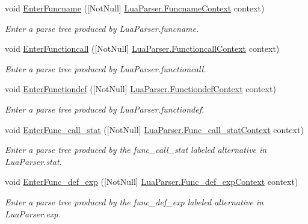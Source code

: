\begin{DoxyCompactItemize}
void \mbox{\hyperlink{classzlua_1_1_compiler_a0da2d547d2333616052b776e192eaae5}{Enter\+Funcname}} (\mbox{[}Not\+Null\mbox{]} \mbox{\hyperlink{classzlua_1_1_lua_parser_1_1_funcname_context}{Lua\+Parser.\+Funcname\+Context}} context)
\begin{DoxyCompactList}\small\item\em Enter a parse tree produced by Lua\+Parser.\+funcname. \end{DoxyCompactList}\item 
void \mbox{\hyperlink{classzlua_1_1_compiler_a17169577cf49b4387d6f65f07354e370}{Enter\+Functioncall}} (\mbox{[}Not\+Null\mbox{]} \mbox{\hyperlink{classzlua_1_1_lua_parser_1_1_functioncall_context}{Lua\+Parser.\+Functioncall\+Context}} context)
\begin{DoxyCompactList}\small\item\em Enter a parse tree produced by Lua\+Parser.\+functioncall. \end{DoxyCompactList}\item 
void \mbox{\hyperlink{classzlua_1_1_compiler_a2e238ee43fa902a36201d2cae25375a1}{Enter\+Functiondef}} (\mbox{[}Not\+Null\mbox{]} \mbox{\hyperlink{classzlua_1_1_lua_parser_1_1_functiondef_context}{Lua\+Parser.\+Functiondef\+Context}} context)
\begin{DoxyCompactList}\small\item\em Enter a parse tree produced by Lua\+Parser.\+functiondef. \end{DoxyCompactList}\item 
void \mbox{\hyperlink{classzlua_1_1_compiler_a8a7c628a67d4fbca64f86739a32b1162}{Enter\+Func\+\_\+call\+\_\+stat}} (\mbox{[}Not\+Null\mbox{]} \mbox{\hyperlink{classzlua_1_1_lua_parser_1_1_func__call__stat_context}{Lua\+Parser.\+Func\+\_\+call\+\_\+stat\+Context}} context)
\begin{DoxyCompactList}\small\item\em Enter a parse tree produced by the {\ttfamily func\+\_\+call\+\_\+stat} labeled alternative in Lua\+Parser.\+stat. \end{DoxyCompactList}\item 
void \mbox{\hyperlink{classzlua_1_1_compiler_a626c3684acd46bdc1812ebd74d2ce10e}{Enter\+Func\+\_\+def\+\_\+exp}} (\mbox{[}Not\+Null\mbox{]} \mbox{\hyperlink{classzlua_1_1_lua_parser_1_1_func__def__exp_context}{Lua\+Parser.\+Func\+\_\+def\+\_\+exp\+Context}} context)
\begin{DoxyCompactList}\small\item\em Enter a parse tree produced by the {\ttfamily func\+\_\+def\+\_\+exp} labeled alternative in Lua\+Parser.\+exp. \end{DoxyCompactList}\item 

\end{DoxyCompactItemize}
